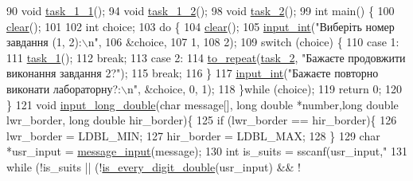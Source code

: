 \begin{DoxyCodeInclude}
90 \textcolor{keywordtype}{void} \hyperlink{main_8c_a40968dfe24ede22947096429f30444a4}{task\_1\_1}();
94 \textcolor{keywordtype}{void} \hyperlink{main_8c_a97a9145d16ec992fa06404b068bd4e18}{task\_1\_2}();
98 \textcolor{keywordtype}{void} \hyperlink{main_8c_a08570886a32f0508e2a3f23c4ea06339}{task\_2}();
99 \textcolor{keywordtype}{int} main() \{
100     \hyperlink{main_8c_aff606fb64ff89d5982673319bab86b19}{clear}();
101 
102     \textcolor{keywordtype}{int} choice;
103     \textcolor{keywordflow}{do} \{
104         \hyperlink{main_8c_aff606fb64ff89d5982673319bab86b19}{clear}();
105         \hyperlink{main_8c_a6f453bc035d85e967bd5032eca31a155}{input\_int}(\textcolor{stringliteral}{"Виберіть номер завдання (1, 2):\(\backslash\)n"},
106                   &choice,
107                   1,
108                   2);
109         \textcolor{keywordflow}{switch} (choice) \{
110             \textcolor{keywordflow}{case} 1:
111                 \hyperlink{main_8c_a2e10594dc040249a898e2880b4c64322}{task\_1}();
112                 \textcolor{keywordflow}{break};
113             \textcolor{keywordflow}{case} 2:
114                 \hyperlink{main_8c_a770281b98587f9f65ca4cc75b1d061db}{to\_repeat}(\hyperlink{main_8c_a08570886a32f0508e2a3f23c4ea06339}{task\_2}, \textcolor{stringliteral}{"Бажаєте продовжити виконання завдання 2?"});
115                 \textcolor{keywordflow}{break};
116         \}
117         \hyperlink{main_8c_a6f453bc035d85e967bd5032eca31a155}{input\_int}(\textcolor{stringliteral}{"Бажаєте повторно виконати лабораторну?:\(\backslash\)n"}, &choice, 0, 1);
118     \}\textcolor{keywordflow}{while} (choice);
119     \textcolor{keywordflow}{return} 0;
120 \}
121 \textcolor{keywordtype}{void} \hyperlink{main_8c_ac835db5eadbfefce4a51eae30806a486}{input\_long\_double}(\textcolor{keywordtype}{char} message[], \textcolor{keywordtype}{long} \textcolor{keywordtype}{double} *number,\textcolor{keywordtype}{long} \textcolor{keywordtype}{double} lwr\_border, \textcolor{keywordtype}{long} \textcolor{keywordtype}{
      double} hir\_border)\{
125     \textcolor{keywordflow}{if} (lwr\_border == hir\_border)\{
126         lwr\_border = LDBL\_MIN;
127         hir\_border = LDBL\_MAX;
128     \}
129     \textcolor{keywordtype}{char} *usr\_input = \hyperlink{main_8c_a638293d509eded9d6ef7552ae1b17f2b}{message\_input}(message);
130     \textcolor{keywordtype}{int} is\_suits = sscanf(usr\_input,\textcolor{stringliteral}{"%
131     \textcolor{keywordflow}{while} (!is\_suits || (!\hyperlink{main_8c_a5d7849c249859dd438a37f1e6e5adf70}{is\_every\_digit\_double}(usr\_input) && !
}
\end{DoxyCodeInclude}
